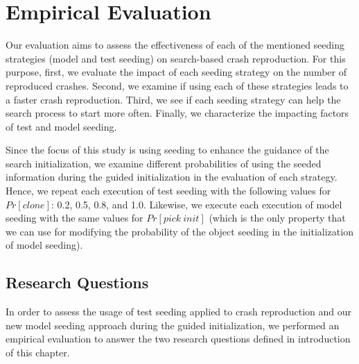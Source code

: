  
\section{Empirical Evaluation}\label{sec:model_seeding:setup}

Our evaluation aims to assess the effectiveness of each of the mentioned seeding strategies (model and test seeding) on search-based crash reproduction.
For this purpose, first, we evaluate the impact of each seeding strategy on the number of reproduced crashes. Second, we examine if using each of these strategies leads to a faster crash reproduction. Third, we see if each seeding strategy can help the search process to start more often. Finally, we characterize the impacting factors of test and model seeding.

Since the focus of this study is using seeding to enhance the guidance of the search initialization, we examine different probabilities of using the seeded information during the guided initialization in the evaluation of each strategy. Hence, we repeat each execution of test seeding with the following values for $Pr[clone]$: 0.2, 0.5, 0.8, and 1.0. Likewise, we execute each execution of model seeding with the same values for $Pr[pick\ init]$ (which is the only property that we can use for modifying the probability of the object seeding in the initialization of model seeding).


\subsection{Research Questions}
\label{sec:model_seeding:setup:rqs}

In order to assess the usage of test seeding applied to crash reproduction and our new model seeding approach during the guided initialization, we performed an empirical evaluation to answer the two research questions defined in introduction of this chapter.

